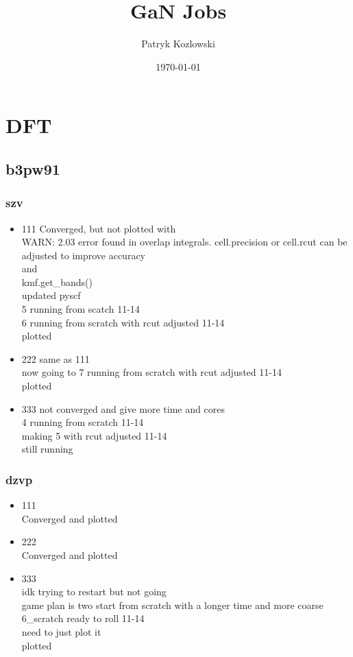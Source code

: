 \documentclass[12pt]{article}
\title{GaN Jobs}
\author{Patryk Kozlowski}
\date{\today}
\begin{document}
\maketitle
\section{DFT}
\subsection{b3pw91}
\subsubsection{szv}
\begin{itemize}
\color{green}
\item 111
Converged, but not plotted with\\
WARN: 2.03 error found in overlap integrals. cell.precision  or  cell.rcut  can be adjusted to improve accuracy\\and\\kmf.get\_bands()\\updated pyscf\\
5 running from scatch 11-14\\
6 running from scratch with rcut adjusted 11-14\\plotted\color{yellow}
\color{green}
\item 222
same as 111\\
now going to 7 running from scratch with rcut adjusted 11-14\\plotted\color{yellow}
\item 333
 not converged and give more time and cores\\ 4 running from scratch 11-14\\making 5 with rcut adjusted 11-14\\still running
\end{itemize}
\subsubsection{dzvp}
\begin{itemize}
\color{green}
\item 111\\Converged and plotted
\color{green}
\item 222\\Converged and plotted
\item 333\\ idk trying to restart but not going \\ game plan is two start from scratch with a longer time and more coarse\\6\_scratch ready to roll 11-14\\need to just plot it\\ plotted
\end{itemize}
\color{green}
\end{document}
